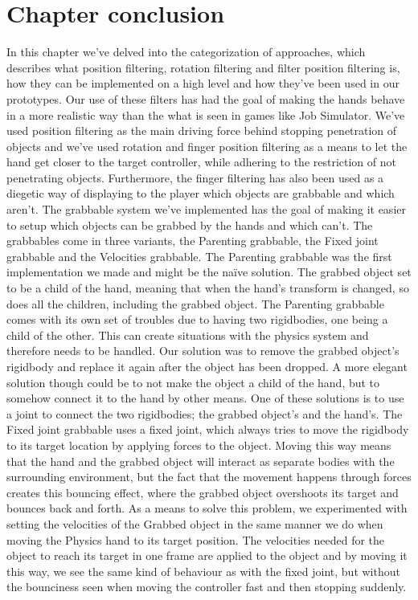 \section{Chapter conclusion}
\label{sec:CHAPTERCONCLUSION}
In this chapter we've delved into the categorization of approaches, which describes what position filtering, rotation filtering and filter position filtering is, how they can be implemented on a high level and how they've been used in our prototypes. Our use of these filters has had the goal of making the hands behave in a more realistic way than the what is seen in games like Job Simulator. We've used position filtering as the main driving force behind stopping penetration of objects and we've used rotation and finger position filtering as a means to let the hand get closer to the target controller, while adhering to the restriction of not penetrating objects. Furthermore, the finger filtering has also been used as a diegetic way of displaying to the player which objects are grabbable and which aren't.
The grabbable system we've implemented has the goal of making it easier to setup which objects can be grabbed by the hands and which can't. The grabbables come in three variants, the Parenting grabbable, the Fixed joint grabbable and the Velocities grabbable. The Parenting grabbable was the first implementation we made and might be the naïve solution. The grabbed object set to be a child of the hand, meaning that when the hand's transform is changed, so does all the children, including the grabbed object. The Parenting grabbable comes with its own set of troubles due to having two rigidbodies, one being a child of the other. This can create situations with the physics system and therefore needs to be handled. Our solution was to remove the grabbed object's rigidbody and replace it again after the object has been dropped. A more elegant solution though could be to not make the object a child of the hand, but to somehow connect it to the hand by other means. One of these solutions is to use a joint to connect the two rigidbodies; the grabbed object's and the hand's. The Fixed joint grabbable uses a fixed joint, which always tries to move the rigidbody to its target location by applying forces to the object. Moving this way means that the hand and the grabbed object will interact as separate bodies with the surrounding environment, but the fact that the movement happens through forces creates this bouncing effect, where the grabbed object overshoots its target and bounces back and forth. As a means to solve this problem, we experimented with setting the velocities of the Grabbed object in the same manner we do when moving the Physics hand to its target position. The velocities needed for the object to reach its target in one frame are applied to the object and by moving it this way, we see the same kind of behaviour as with the fixed joint, but without the bounciness seen when moving the controller fast and then stopping suddenly.

